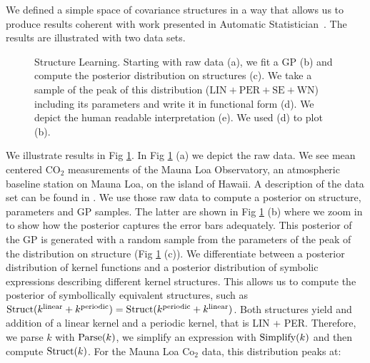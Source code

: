 \newpage
We defined a simple space of covariance structures in a way that allows us to produce results coherent with 
work presented in Automatic Statistician~\citep{duvenaud2013structure,lloyd2014automatic}. The results are illustrated with two data sets.

\begin{figure}
\centering

\caption{\footnotesize Structure Learning. Starting with raw data (a), we fit a \ac{GP}
(b) and compute the posterior distribution on structures (c). We take a sample
of the peak of this distribution ($\text{LIN}+\text{PER}+\text{SE}+\text{WN}$)
including its parameters and write it in functional form (d). We depict the
human readable interpretation (e). We used (d) to plot (b).}\label{fig:posterior}
\end{figure}
We illustrate results in Fig \ref{fig:posterior}. In Fig \ref{fig:posterior} (a) we depict the raw data. 
We see mean centered CO$_2$ measurements of the Mauna Loa Observatory, an atmospheric
baseline station on Mauna Loa, on the island of Hawaii. 
A description of the data set  can be found in  \citealp[][chapter 5]{rasmussen2006gaussian}.  
We use those raw data to compute a posterior on structure, parameters and \ac{GP}
samples.
The latter are shown in  Fig \ref{fig:posterior} (b)
where we zoom in to show how the posterior captures the error bars
adequately.
This posterior of the \ac{GP} is generated with a random sample from the parameters
of the peak of the distribution on structure (Fig \ref{fig:posterior} (c)).
We differentiate between a posterior distribution of kernel functions and  a
posterior distribution of
symbolic expressions describing different kernel structures. 
This allows us to compute the posterior of symbollically equivalent structures,
such as $\text{Struct}(k^\text{linear} + k^\text{periodic})=\text{Struct}(k^\text{periodic} + k^\text{linear})$. Both structures yield
and addition of a linear kernel and a periodic kernel, that is LIN + PER.
Therefore, we parse $k$ with $\text{Parse}(k)$, we simplify an expression with $\text{Simplify}(k)$ and
then compute $\text{Struct}(k)$.
For the Mauna Loa Co$_2$ data, this distribution peaks at:
